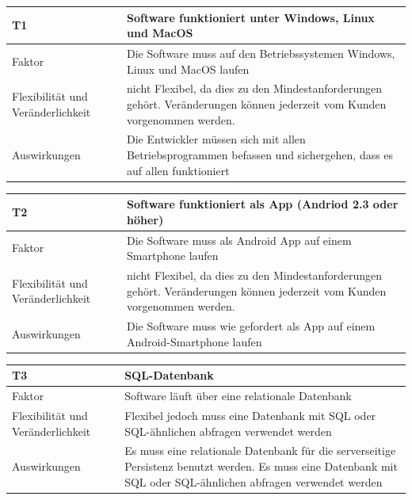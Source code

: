 \documentclass[fontsize=12pt,paper=a4,twoside]{scrartcl}
\begin{document}
\begin{table}[H]
\begin{tabular}{|p{3cm}|p{12cm}|}\hline
T1 & Software funktioniert unter Windows, Linux und MacOS \\ \hline
Faktor & Die Software muss auf den Betriebssystemen Windows, Linux und MacOS laufen\\ \hline
Flexibilität und Veränderlichkeit & nicht Flexibel, da dies zu den Mindestanforderungen gehört. Veränderungen können jederzeit vom Kunden vorgenommen werden.  \\ \hline
Auswirkungen & Die Entwickler müssen sich mit allen Betriebsprogrammen befassen und sichergehen, dass es auf allen funktioniert\\ \hline
\end{tabular}
\end{table}


\begin{table}[H]
\begin{tabular}{|p{3cm}|p{12cm}|}\hline
T2 & Software funktioniert als App (Andriod 2.3 oder höher) \\ \hline
Faktor & Die Software muss als Android App auf einem Smartphone laufen\\ \hline
Flexibilität und Veränderlichkeit & nicht Flexibel, da dies zu den Mindestanforderungen gehört. Veränderungen können jederzeit vom Kunden vorgenommen werden.  \\ \hline
Auswirkungen & Die Software muss wie gefordert als App auf einem Android-Smartphone laufen\\ \hline
\end{tabular}
\end{table}


\begin{table}[H]
\begin{tabular}{|p{3cm}|p{12cm}|}\hline
T3 & SQL-Datenbank \\ \hline
Faktor & Software läuft über eine relationale Datenbank\\ \hline
Flexibilität und Veränderlichkeit & Flexibel jedoch muss eine Datenbank mit SQL oder SQL-ähnlichen abfragen verwendet werden  \\ \hline
Auswirkungen & Es muss eine relationale Datenbank für die serverseitige Persistenz benutzt werden. Es muss eine Datenbank mit SQL oder SQL-ähnlichen abfragen verwendet werden\\ \hline
\end{tabular}
\end{table}
\end{document}
